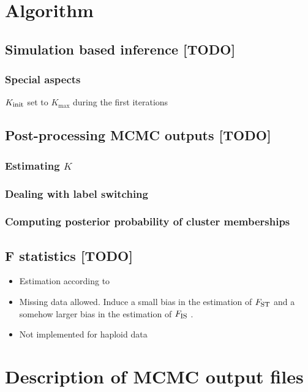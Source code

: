 \documentclass{article}
\newcommand{\Fst}{F_{\mbox{\footnotesize ST}}}
\newcommand{\Fis}{F_{\mbox{\footnotesize IS}}}
\begin{document}
\clearpage

\section{Algorithm}\label{sec:algo}

\subsection{Simulation based inference [TODO] }

\subsubsection{Special aspects}
$K_{\mbox{\footnotesize init}}$ set to $K_{\max}$ during the first iterations

\subsection{Post-processing MCMC outputs [TODO] }

\subsubsection{Estimating $K$}

\subsubsection{Dealing with label switching} 

\subsubsection{Computing posterior probability of cluster memberships}


\subsection{F statistics [TODO] }

\begin{itemize}
\item Estimation according to \citet{Weir84}
\item Missing data allowed. Induce a small bias in the estimation of $\Fst$ and a somehow larger bias in the estimation of $\Fis$ .
\item Not implemented for haploid data
\end{itemize}

\section{Description of MCMC output files }
\end{document}
